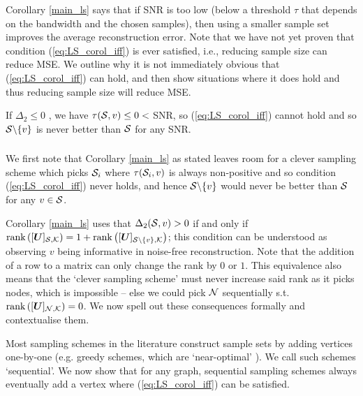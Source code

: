 Corollary \ref{main_ls} says that if SNR is too low (below a threshold $\tau$ that depends on the bandwidth and the chosen samples), then using a smaller sample set improves the average reconstruction error. Note that we have not yet proven that condition (\ref{eq:LS_corol_iff}) is ever satisfied, i.e., reducing sample size can reduce MSE. We outline why it is not immediately obvious that (\ref{eq:LS_corol_iff}) can hold, and then show situations where it does hold and thus reducing sample size will reduce MSE.

\begin{remark}
    If $\Delta_{2} \leq 0$ , we have $\tau(\mathcal{S},v) \leq 0 < $ SNR, so (\ref{eq:LS_corol_iff}) cannot hold and so $\mathcal{S} \backslash \{v\}$ is never better than $\mathcal{S}$ for any SNR.
\end{remark}

\subsubsection{}
We first note that Corollary \ref{main_ls} {\color{black} as stated} leaves room for a clever sampling scheme which picks $\mathcal{S}_{i}$ where $\tau(\mathcal{S}_{i},v)$ is always non-positive and so condition (\ref{eq:LS_corol_iff}) never holds, and hence $\mathcal{S} \backslash \{v\}$ would never be better than $\mathcal{S}$ for any $v \in \mathcal{S}$. 

{\color{black} Corollary \ref{main_ls} uses that $\Delta_{2}(\mathcal{S},v) > 0$ if and only if $ \textrm{rank}\left([\bm{U}]_{\mathcal{S}, \mathcal{K}}\right) = 1 + \textrm{rank}\left([\bm{U}]_{\mathcal{S} \backslash \{v\}, \mathcal{K}}\right)$; this condition can be understood as observing $v$ being informative in noise-free reconstruction. Note that the addition of a row to a matrix can only change the rank by $0$ or $1$. This equivalence also means that the `clever sampling scheme' must never increase said rank as it picks nodes, which is impossible -- else we could pick $\mathcal{N}$ sequentially s.t. $\rank{\matrsubU{N}} = 0$. We now spell out these consequences formally and contextualise them. }

Most sampling schemes in the literature  construct sample sets by adding vertices one-by-one (e.g. greedy schemes, which are `near-optimal' \cite{chamon2016near}). We call such schemes `sequential'. We now show that for any graph, sequential sampling schemes always eventually add a vertex where (\ref{eq:LS_corol_iff}) can be satisfied.


